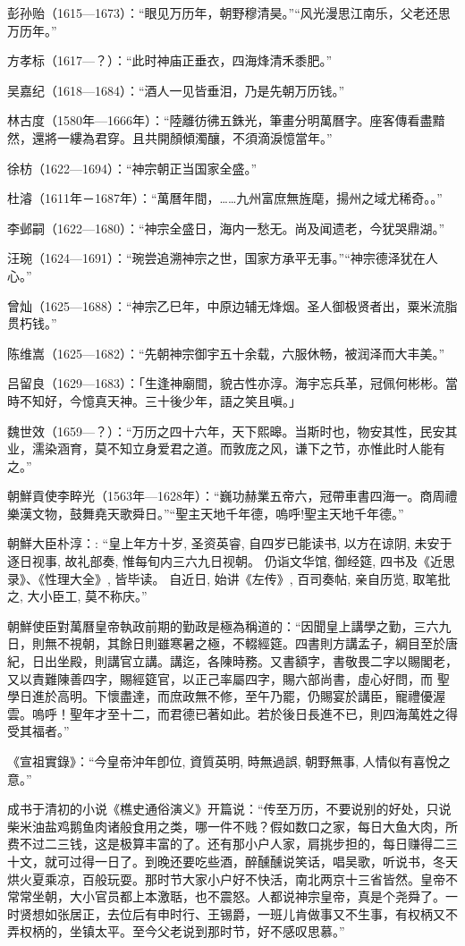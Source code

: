 彭孙贻（1615—1673）：“眼见万历年，朝野穆清昊。”“风光漫思江南乐，父老还思万历年。”

方孝标（1617—？）：“此时神庙正垂衣，四海烽清禾黍肥。”

吴嘉纪（1618—1684）：“酒人一见皆垂泪，乃是先朝万历钱。”

林古度（1580年—1666年）：“陸離彷彿五銖光，筆畫分明萬曆字。座客傳看盡黯然，還將一縷為君穿。且共開顏傾濁釀，不須滴淚憶當年。”

徐枋（1622—1694）：“神宗朝正当国家全盛。”

杜濬（1611年－1687年）：“萬曆年間，……九州富庶無旌麾，揚州之域尤稀奇。。”

李邺嗣（1622—1680）：“神宗全盛日，海内一愁无。尚及闻遗老，今犹哭鼎湖。”

汪琬（1624—1691）：“琬尝追溯神宗之世，国家方承平无事。”“神宗德泽犹在人心。”

曾灿（1625—1688）：“神宗乙巳年，中原边辅无烽烟。圣人御极贤者出，粟米流脂贯朽钱。”

陈维嵩（1625—1682）：“先朝神宗御宇五十余载，六服休畅，被润泽而大丰美。”

吕留良（1629—1683）：「生逢神廟間，貌古性亦淳。海宇忘兵革，冠佩何彬彬。當時不知好，今憶真天神。三十後少年，語之笑且嗔。」

魏世效（1659—？）：“万历之四十六年，天下熙暤。当斯时也，物安其性，民安其业，濡染涵育，莫不知立身爱君之道。而敦庞之风，谦下之节，亦惟此时人能有之。”

朝鮮貢使李睟光（1563年—1628年）：“巍功赫業五帝六，冠帶車書四海一。商周禮樂漢文物，鼓舞堯天歌舜日。”“聖主天地千年德，嗚呼!聖主天地千年德。”

朝鮮大臣朴淳：: “皇上年方十岁, 圣资英睿, 自四岁已能读书, 以方在谅阴, 未安于逐日视事, 故礼部奏, 惟每旬内三六九日视朝。 仍诣文华馆, 御经筵, 四书及《近思录》、《性理大全》, 皆毕读。 自近日, 始讲《左传》, 百司奏帖, 亲自历览, 取笔批之, 大小臣工, 莫不称庆。”

朝鮮使臣對萬曆皇帝執政前期的勤政是極為稱道的：“因聞皇上講學之勤，三六九日，則無不視朝，其餘日則雖寒暑之極，不輟經筵。四書則方講孟子，綱目至於唐紀，日出坐殿，則講官立講。講迄，各陳時務。又書額字，書敬畏二字以賜閣老，又以責難陳善四字，賜經筵官，以正己率屬四字，賜六部尚書，虛心好問，而 聖學日進於高明。下懷盡達，而庶政無不修，至午乃罷，仍賜宴於講臣，寵禮優渥雲。嗚呼！聖年才至十二，而君德已著如此。若於後日長進不已，則四海萬姓之得受其福者。”

《宣祖實錄》：“今皇帝沖年卽位, 資質英明, 時無過誤, 朝野無事, 人情似有喜悅之意。”

成书于清初的小说《樵史通俗演义》开篇说：“传至万历，不要说别的好处，只说柴米油盐鸡鹅鱼肉诸般食用之类，哪一件不贱？假如数口之家，每日大鱼大肉，所费不过二三钱，这是极算丰富的了。还有那小户人家，肩挑步担的，每日赚得二三十文，就可过得一日了。到晚还要吃些酒，醉醺醺说笑话，唱吴歌，听说书，冬天烘火夏乘凉，百般玩耍。那时节大家小户好不快活，南北两京十三省皆然。皇帝不常常坐朝，大小官员都上本激聒，也不震怒。人都说神宗皇帝，真是个尧舜了。一时贤想如张居正，去位后有申时行、王锡爵，一班儿肯做事又不生事，有权柄又不弄权柄的，坐镇太平。至今父老说到那时节，好不感叹思慕。”

